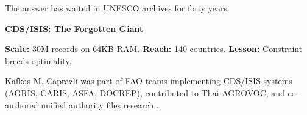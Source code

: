 \documentclass[manuscript,screen,nonacm]{acmart}
\newenvironment{sidebarbox}[1][]{%
  \def\sidebarboxtitle{#1}%
  \begin{oframed}%
  \noindent\textbf{\sidebarboxtitle}\par\smallskip
}{%
  \end{oframed}%
}
\begin{document}
The answer has waited in UNESCO archives for forty years.

\begin{sidebarbox}[CDS/ISIS: The Forgotten Giant]
\textbf{Scale:} 30M records on 64KB RAM. \textbf{Reach:} 140 countries. \textbf{Lesson:} Constraint breeds optimality.
\end{sidebarbox}




\begin{acks}
Kafkas M. Caprazli was part of FAO teams implementing CDS/ISIS systems (AGRIS, CARIS, ASFA, DOCREP), contributed to Thai AGROVOC, and co-authored unified authority files research \cite{caprazli2003}.
\end{acks}
\end{document}
